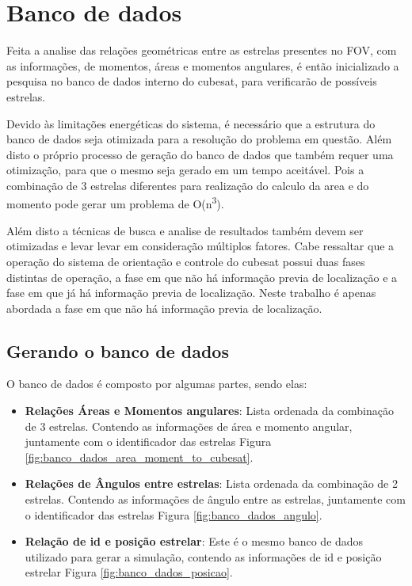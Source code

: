 \section{Banco de dados}

Feita a analise das relações geométricas entre as estrelas presentes no FOV, com as informações, de momentos, áreas e momentos angulares, 
é então inicializado a pesquisa no banco de dados interno do cubesat, para verificarão de possíveis estrelas.

Devido às limitações energéticas do sistema, é necessário que a estrutura do banco de dados seja otimizada para a resolução do problema em questão.
Além disto o próprio processo de geração do banco de dados que também requer uma otimização, para que o mesmo seja gerado em um tempo aceitável.
Pois a combinação de 3 estrelas diferentes para realização do calculo da area e do momento pode gerar um problema de O(n\textsuperscript{3}).

Além disto a técnicas de busca e analise de resultados também devem ser otimizadas e levar levar em consideração múltiplos fatores.
Cabe ressaltar que a operação do sistema de orientação e controle do cubesat possui duas fases distintas de operação, a fase em que não há informação previa de localização e a fase em que já há informação previa de localização.
Neste trabalho é apenas abordada a fase em que não há informação previa de localização.

\subsection{Gerando o banco de dados}
O banco de dados é composto por algumas partes, sendo elas:
\begin{itemize}
    \item \textbf{Relações Áreas e Momentos angulares}: Lista ordenada da combinação de 3 estrelas. Contendo as informações de área e momento angular, juntamente com o identificador das estrelas Figura \ref{fig:banco_dados_area_moment_to_cubesat}.
    \item \textbf{Relações de Ângulos entre estrelas}: Lista ordenada da combinação de 2 estrelas. Contendo as informações de ângulo entre as estrelas, juntamente com o identificador das estrelas Figura \ref{fig:banco_dados_angulo}.
    \item \textbf{Relação de id e posição estrelar}: Este é o mesmo banco de dados utilizado para gerar a simulação, contendo as informações de id e posição estrelar Figura \ref{fig:banco_dados_posicao}.
\end{itemize}

